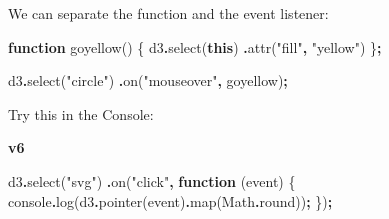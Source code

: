 \documentclass[
  openany]{book}
\newenvironment{Shaded}{\begin{snugshade}}{\end{snugshade}}
\newcommand{\BuiltInTok}[1]{#1}
\newcommand{\FunctionTok}[1]{\textcolor[rgb]{0.00,0.00,0.00}{#1}}
\newcommand{\KeywordTok}[1]{\textcolor[rgb]{0.13,0.29,0.53}{\textbf{#1}}}
\newcommand{\NormalTok}[1]{#1}
\newcommand{\OperatorTok}[1]{\textcolor[rgb]{0.81,0.36,0.00}{\textbf{#1}}}
\newcommand{\SpecialCharTok}[1]{\textcolor[rgb]{0.00,0.00,0.00}{#1}}
\newcommand{\StringTok}[1]{\textcolor[rgb]{0.31,0.60,0.02}{#1}}
\newcommand{\VerbatimStringTok}[1]{\textcolor[rgb]{0.31,0.60,0.02}{#1}}
\begin{document}
\begin{Shaded}
\end{Shaded}

We can separate the function and the event listener:

\begin{Shaded}
\begin{Highlighting}[]
\KeywordTok{function} \FunctionTok{goyellow}\NormalTok{() \{}
\NormalTok{  d3}\OperatorTok{.}\FunctionTok{select}\NormalTok{(}\KeywordTok{this}\NormalTok{)}
    \OperatorTok{.}\FunctionTok{attr}\NormalTok{(}\StringTok{"fill"}\OperatorTok{,} \StringTok{"yellow"}\NormalTok{)}
\NormalTok{    \}}\OperatorTok{;}
\end{Highlighting}
\end{Shaded}

\begin{Shaded}
\begin{Highlighting}[]
\NormalTok{d3}\OperatorTok{.}\FunctionTok{select}\NormalTok{(}\StringTok{"circle"}\NormalTok{)}
  \OperatorTok{.}\FunctionTok{on}\NormalTok{(}\StringTok{"mouseover"}\OperatorTok{,}\NormalTok{ goyellow)}\OperatorTok{;}
\end{Highlighting}
\end{Shaded}

Try this in the Console:

\textbf{v6}

\begin{Shaded}
\begin{Highlighting}[]
\NormalTok{d3}\OperatorTok{.}\FunctionTok{select}\NormalTok{(}\StringTok{"svg"}\NormalTok{)}
  \OperatorTok{.}\FunctionTok{on}\NormalTok{(}\StringTok{"click"}\OperatorTok{,} \KeywordTok{function}\NormalTok{ (}\BuiltInTok{event}\NormalTok{) \{}
    \BuiltInTok{console}\OperatorTok{.}\FunctionTok{log}\NormalTok{(d3}\OperatorTok{.}\FunctionTok{pointer}\NormalTok{(}\BuiltInTok{event}\NormalTok{)}\OperatorTok{.}\FunctionTok{map}\NormalTok{(}\BuiltInTok{Math}\OperatorTok{.}\FunctionTok{round}\NormalTok{))}\OperatorTok{;}
\NormalTok{    \})}\OperatorTok{;}
\end{Highlighting}
\end{Shaded}
\end{document}
